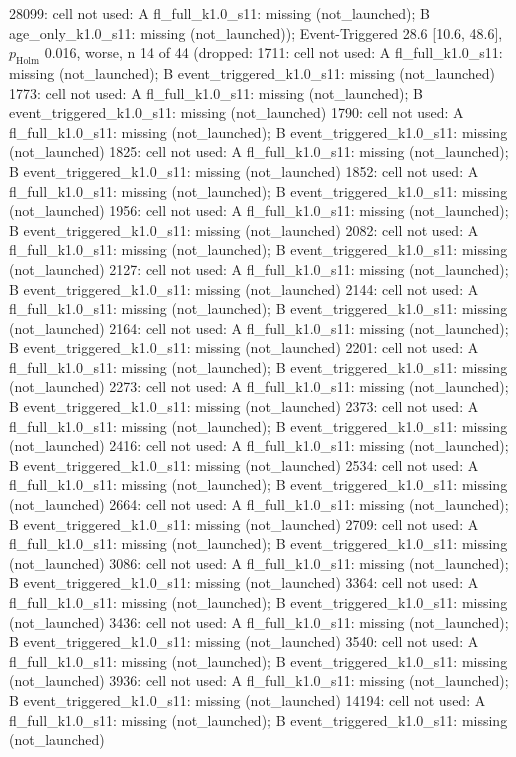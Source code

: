 \begin{table}[t]
{28099: cell not used: A fl\_full\_k1.0\_s11: missing (not\_launched); B age\_only\_k1.0\_s11: missing (not\_launched)); Event-Triggered 28.6 [10.6, 48.6], $p_\mathrm{Holm}$ 0.016, worse, n 14 of 44 (dropped: 1711: cell not used: A fl\_full\_k1.0\_s11: missing (not\_launched); B event\_triggered\_k1.0\_s11: missing (not\_launched) \textbar{} 1773: cell not used: A fl\_full\_k1.0\_s11: missing (not\_launched); B event\_triggered\_k1.0\_s11: missing (not\_launched) \textbar{} 1790: cell not used: A fl\_full\_k1.0\_s11: missing (not\_launched); B event\_triggered\_k1.0\_s11: missing (not\_launched) \textbar{} 1825: cell not used: A fl\_full\_k1.0\_s11: missing (not\_launched); B event\_triggered\_k1.0\_s11: missing (not\_launched) \textbar{} 1852: cell not used: A fl\_full\_k1.0\_s11: missing (not\_launched); B event\_triggered\_k1.0\_s11: missing (not\_launched) \textbar{} 1956: cell not used: A fl\_full\_k1.0\_s11: missing (not\_launched); B event\_triggered\_k1.0\_s11: missing (not\_launched) \textbar{} 2082: cell not used: A fl\_full\_k1.0\_s11: missing (not\_launched); B event\_triggered\_k1.0\_s11: missing (not\_launched) \textbar{} 2127: cell not used: A fl\_full\_k1.0\_s11: missing (not\_launched); B event\_triggered\_k1.0\_s11: missing (not\_launched) \textbar{} 2144: cell not used: A fl\_full\_k1.0\_s11: missing (not\_launched); B event\_triggered\_k1.0\_s11: missing (not\_launched) \textbar{} 2164: cell not used: A fl\_full\_k1.0\_s11: missing (not\_launched); B event\_triggered\_k1.0\_s11: missing (not\_launched) \textbar{} 2201: cell not used: A fl\_full\_k1.0\_s11: missing (not\_launched); B event\_triggered\_k1.0\_s11: missing (not\_launched) \textbar{} 2273: cell not used: A fl\_full\_k1.0\_s11: missing (not\_launched); B event\_triggered\_k1.0\_s11: missing (not\_launched) \textbar{} 2373: cell not used: A fl\_full\_k1.0\_s11: missing (not\_launched); B event\_triggered\_k1.0\_s11: missing (not\_launched) \textbar{} 2416: cell not used: A fl\_full\_k1.0\_s11: missing (not\_launched); B event\_triggered\_k1.0\_s11: missing (not\_launched) \textbar{} 2534: cell not used: A fl\_full\_k1.0\_s11: missing (not\_launched); B event\_triggered\_k1.0\_s11: missing (not\_launched) \textbar{} 2664: cell not used: A fl\_full\_k1.0\_s11: missing (not\_launched); B event\_triggered\_k1.0\_s11: missing (not\_launched) \textbar{} 2709: cell not used: A fl\_full\_k1.0\_s11: missing (not\_launched); B event\_triggered\_k1.0\_s11: missing (not\_launched) \textbar{} 3086: cell not used: A fl\_full\_k1.0\_s11: missing (not\_launched); B event\_triggered\_k1.0\_s11: missing (not\_launched) \textbar{} 3364: cell not used: A fl\_full\_k1.0\_s11: missing (not\_launched); B event\_triggered\_k1.0\_s11: missing (not\_launched) \textbar{} 3436: cell not used: A fl\_full\_k1.0\_s11: missing (not\_launched); B event\_triggered\_k1.0\_s11: missing (not\_launched) \textbar{} 3540: cell not used: A fl\_full\_k1.0\_s11: missing (not\_launched); B event\_triggered\_k1.0\_s11: missing (not\_launched) \textbar{} 3936: cell not used: A fl\_full\_k1.0\_s11: missing (not\_launched); B event\_triggered\_k1.0\_s11: missing (not\_launched) \textbar{} 14194: cell not used: A fl\_full\_k1.0\_s11: missing (not\_launched); B event\_triggered\_k1.0\_s11: missing (not\_launched) \textbar{} }
\end{table}
